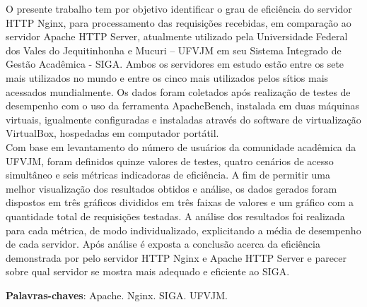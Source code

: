 \setlength{\absparsep}{18pt} %
\begin{resumo}
O presente trabalho tem por objetivo identificar o grau de eficiência do 
servidor HTTP Nginx, para processamento das requisições recebidas, em 
comparação ao servidor Apache HTTP Server, atualmente utilizado pela 
Universidade Federal dos Vales do Jequitinhonha e Mucuri – UFVJM em seu Sistema 
Integrado de Gestão Acadêmica - SIGA. Ambos os servidores em estudo estão entre 
os sete mais utilizados no mundo e entre os cinco mais utilizados pelos sítios 
mais acessados mundialmente. Os dados foram coletados após realização de testes 
de desempenho com o uso da ferramenta ApacheBench, instalada em duas máquinas 
virtuais, igualmente configuradas e instaladas através do software de 
virtualização VirtualBox, hospedadas em computador portátil.\\
Com base em levantamento do número de usuários da comunidade acadêmica da 
UFVJM, foram definidos quinze valores de testes, quatro cenários  de acesso 
simultâneo e seis métricas indicadoras de eficiência. A fim de permitir uma 
melhor visualização dos resultados obtidos e análise, os dados gerados foram 
dispostos em três gráficos divididos em três faixas de valores e um gráfico com 
a quantidade total de requisições testadas. A análise dos resultados foi 
realizada para cada métrica, de modo individualizado, explicitando a média de 
desempenho de cada servidor. Após análise é exposta a conclusão acerca da 
eficiência demonstrada por pelo servidor HTTP Nginx e Apache HTTP Server e 
parecer sobre  qual servidor se mostra  mais adequado e eficiente ao SIGA.


 \textbf{Palavras-chaves}: Apache. Nginx. SIGA. UFVJM.
\end{resumo}